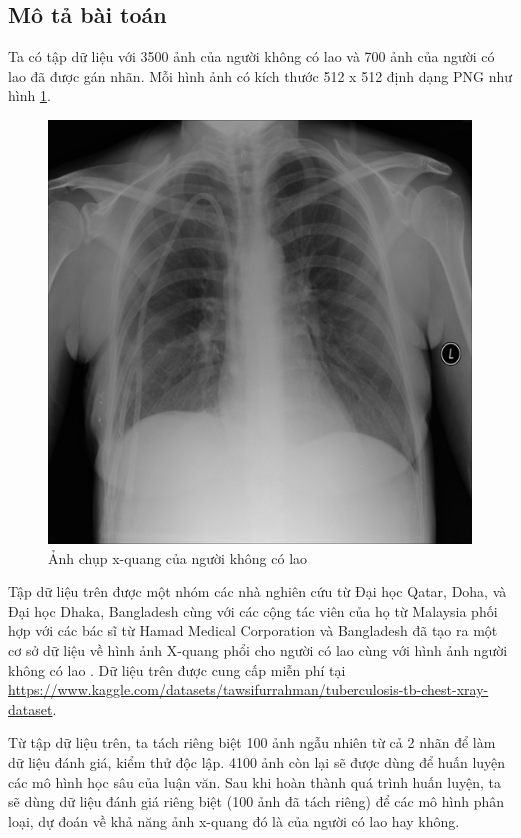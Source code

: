 \subsection{Mô tả bài toán}
Ta có tập dữ liệu với 3500 ảnh của người không có lao và 700 ảnh của người có lao đã được gán nhãn. Mỗi hình ảnh có kích thước 512 x 512 định dạng PNG như hình \ref{fig:normalimg}.
\begin{figure}[H]
	\centering
	\includegraphics[width=0.55\linewidth]{images/Normal-1.png}
	\caption{Ảnh chụp x-quang của người không có lao}
	\label{fig:normalimg}
\end{figure}
Tập dữ liệu trên được một nhóm các nhà nghiên cứu từ Đại học Qatar, Doha, và Đại học Dhaka, Bangladesh cùng với các cộng tác viên của họ từ Malaysia phối hợp với các bác sĩ từ Hamad Medical Corporation và Bangladesh đã tạo ra một cơ sở dữ liệu về hình ảnh X-quang phổi cho người có lao cùng với hình ảnh người không có lao \cite{dataset}. Dữ liệu trên được cung cấp miễn phí tại \href{https://www.kaggle.com/datasets/tawsifurrahman/tuberculosis-tb-chest-xray-dataset}{https://www.kaggle.com/datasets/tawsifurrahman/tuberculosis-tb-chest-xray-dataset}.

Từ tập dữ liệu trên, ta tách riêng biệt 100 ảnh ngẫu nhiên từ cả 2 nhãn để làm dữ liệu đánh giá, kiểm thử độc lập. 4100 ảnh còn lại sẽ được dùng để huấn luyện các mô hình học sâu của luận văn. Sau khi hoàn thành quá trình huấn luyện, ta sẽ dùng dữ liệu đánh giá riêng biệt (100 ảnh đã tách riêng) để các mô hình phân loại, dự đoán về khả năng ảnh x-quang đó là của người có lao hay không.